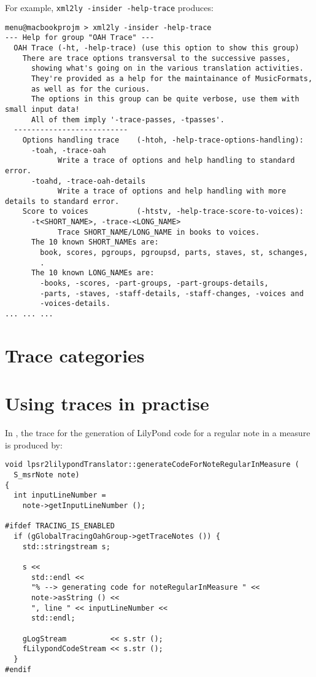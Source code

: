 For example, {\tt xml2ly -insider -help-trace} produces:
\begin{lstlisting}[language=Terminal]
menu@macbookprojm > xml2ly -insider -help-trace
--- Help for group "OAH Trace" ---
  OAH Trace (-ht, -help-trace) (use this option to show this group)
    There are trace options transversal to the successive passes,
      showing what's going on in the various translation activities.
      They're provided as a help for the maintainance of MusicFormats,
      as well as for the curious.
      The options in this group can be quite verbose, use them with small input data!
      All of them imply '-trace-passes, -tpasses'.
  --------------------------
    Options handling trace    (-htoh, -help-trace-options-handling):
      -toah, -trace-oah
            Write a trace of options and help handling to standard error.
      -toahd, -trace-oah-details
            Write a trace of options and help handling with more details to standard error.
    Score to voices           (-htstv, -help-trace-score-to-voices):
      -t<SHORT_NAME>, -trace-<LONG_NAME>
            Trace SHORT_NAME/LONG_NAME in books to voices.
      The 10 known SHORT_NAMEs are:
        book, scores, pgroups, pgroupsd, parts, staves, st, schanges,
        .
      The 10 known LONG_NAMEs are:
        -books, -scores, -part-groups, -part-groups-details,
        -parts, -staves, -staff-details, -staff-changes, -voices and
        -voices-details.
... ... ...
\end{lstlisting}


\section{Trace categories}

\section{Using traces in practise}

In , the trace for the generation of LilyPond code for a regular note in a measure is produced by:
\begin{lstlisting}[language=CPlusPlus]
void lpsr2lilypondTranslator::generateCodeForNoteRegularInMeasure (
  S_msrNote note)
{
  int inputLineNumber =
    note->getInputLineNumber ();

#ifdef TRACING_IS_ENABLED
  if (gGlobalTracingOahGroup->getTraceNotes ()) {
    std::stringstream s;

    s <<
      std::endl <<
      "% --> generating code for noteRegularInMeasure " <<
      note->asString () <<
      ", line " << inputLineNumber <<
      std::endl;

    gLogStream          << s.str ();
    fLilypondCodeStream << s.str ();
  }
#endif

\end{lstlisting}


